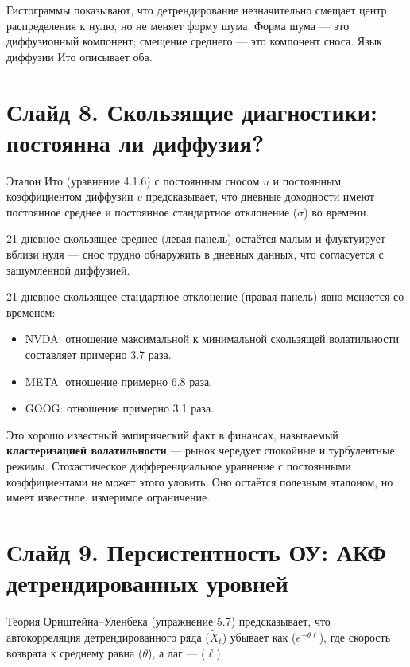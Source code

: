 \documentclass[12pt,a4paper]{article}
\begin{document}
Гистограммы показывают, что детрендирование незначительно смещает центр
распределения к нулю, но не меняет форму шума.
Форма шума --- это диффузионный компонент;
смещение среднего --- это компонент сноса.
Язык диффузии Ито описывает оба.

\section{Слайд 8. Скользящие диагностики: постоянна ли диффузия?}

Эталон Ито (уравнение 4.1.6) с постоянным сносом $u$ и постоянным коэффициентом
диффузии $v$ предсказывает, что дневные доходности имеют постоянное среднее
и постоянное стандартное отклонение ($\sigma$) во времени.

21-дневное скользящее среднее (левая панель) остаётся малым и флуктуирует вблизи нуля ---
снос трудно обнаружить в дневных данных, что согласуется с зашумлённой диффузией.

21-дневное скользящее стандартное отклонение (правая панель) явно меняется со временем:
\begin{itemize}
  \item NVDA: отношение максимальной к минимальной скользящей волатильности
        составляет примерно 3.7 раза.
  \item META: отношение примерно 6.8 раза.
  \item GOOG: отношение примерно 3.1 раза.
\end{itemize}

Это хорошо известный эмпирический факт в финансах, называемый
\textbf{кластеризацией волатильности} ---
рынок чередует спокойные и турбулентные режимы.
Стохастическое дифференциальное уравнение с постоянными коэффициентами
не может этого уловить.
Оно остаётся полезным эталоном, но имеет известное, измеримое ограничение.

\section{Слайд 9. Персистентность ОУ: АКФ детрендированных уровней}

Теория Орнштейна--Уленбека (упражнение 5.7) предсказывает, что
автокорреляция детрендированного ряда ($\widetilde{X}_t$) убывает как ($e^{-\theta\ell}$),
где скорость возврата к среднему равна ($\theta$),
а лаг --- ($\ell$).
\end{document}
